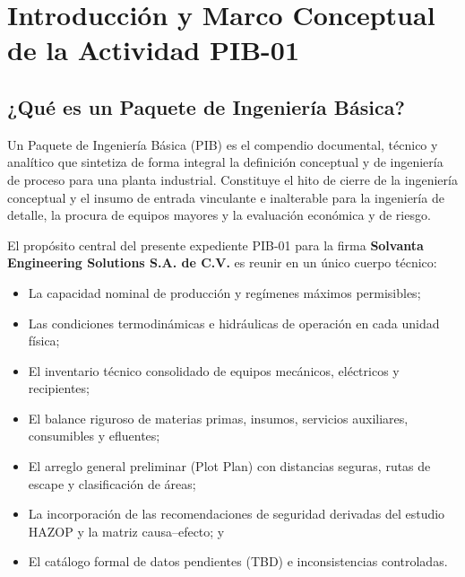 \documentclass[10pt,letterpaper]{article}
\begin{document}
\vspace{0.3cm}
\tableofcontents
\vspace{0.3cm}
\listoftables
\vspace{0.3cm}
\listoffigures
\newpage

\section{Introducción y Marco Conceptual de la Actividad PIB-01}

\subsection{¿Qué es un Paquete de Ingeniería Básica?}
Un Paquete de Ingeniería Básica (PIB) es el compendio documental, técnico y analítico que sintetiza de forma integral la definición conceptual y de ingeniería de proceso para una planta industrial. Constituye el hito de cierre de la ingeniería conceptual y el insumo de entrada vinculante e inalterable para la ingeniería de detalle, la procura de equipos mayores y la evaluación económica y de riesgo.

El propósito central del presente expediente PIB-01 para la firma \textbf{Solvanta Engineering Solutions S.A. de C.V.} es reunir en un único cuerpo técnico:
\begin{itemize}
    \item La capacidad nominal de producción y regímenes máximos permisibles;
    \item Las condiciones termodinámicas e hidráulicas de operación en cada unidad física;
    \item El inventario técnico consolidado de equipos mecánicos, eléctricos y recipientes;
    \item El balance riguroso de materias primas, insumos, servicios auxiliares, consumibles y efluentes;
    \item El arreglo general preliminar (Plot Plan) con distancias seguras, rutas de escape y clasificación de áreas;
    \item La incorporación de las recomendaciones de seguridad derivadas del estudio HAZOP y la matriz causa--efecto; y
    \item El catálogo formal de datos pendientes (TBD) e inconsistencias controladas.
\end{itemize}
\end{document}
